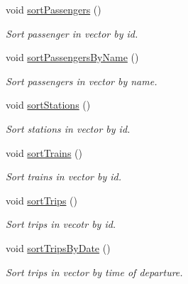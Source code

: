 \begin{DoxyCompactItemize}
void \mbox{\hyperlink{classSystem_a360f9d625dbc649d567249642c1db53c}{sort\+Passengers}} ()
\begin{DoxyCompactList}\small\item\em Sort passenger in vector by id. \end{DoxyCompactList}\item 
\mbox{\label{classSystem_ae3b7301dda5863379777c863df0b976e}} 
void \mbox{\hyperlink{classSystem_ae3b7301dda5863379777c863df0b976e}{sort\+Passengers\+By\+Name}} ()
\begin{DoxyCompactList}\small\item\em Sort passengers in vector by name. \end{DoxyCompactList}\item 
\mbox{\label{classSystem_a94f061c2fa79b7f0e4f175fc68a59246}} 
void \mbox{\hyperlink{classSystem_a94f061c2fa79b7f0e4f175fc68a59246}{sort\+Stations}} ()
\begin{DoxyCompactList}\small\item\em Sort stations in vector by id. \end{DoxyCompactList}\item 
\mbox{\label{classSystem_a3961bbb1e8a309ef37c4366731bbb813}} 
void \mbox{\hyperlink{classSystem_a3961bbb1e8a309ef37c4366731bbb813}{sort\+Trains}} ()
\begin{DoxyCompactList}\small\item\em Sort trains in vector by id. \end{DoxyCompactList}\item 
\mbox{\label{classSystem_a9122a0e24a88b5111959fdc87b23bc6b}} 
void \mbox{\hyperlink{classSystem_a9122a0e24a88b5111959fdc87b23bc6b}{sort\+Trips}} ()
\begin{DoxyCompactList}\small\item\em Sort trips in vecotr by id. \end{DoxyCompactList}\item 
\mbox{\label{classSystem_a3a2aace3c50cfbf7f9d2354cd858a59b}} 
void \mbox{\hyperlink{classSystem_a3a2aace3c50cfbf7f9d2354cd858a59b}{sort\+Trips\+By\+Date}} ()
\begin{DoxyCompactList}\small\item\em Sort trips in vector by time of departure. \end{DoxyCompactList}\item 

\end{DoxyCompactItemize}
